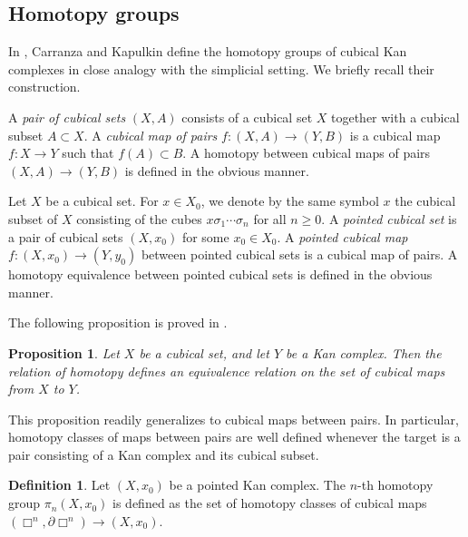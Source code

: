 \documentclass[oneside, 12pt]{amsart}
\numberwithin{equation}{section}
\theoremstyle{plain}
\newtheorem{proposition}[theorem]{Proposition}
\theoremstyle{definition}
\newtheorem{definition}[theorem]{Definition}
\theoremstyle{remark}
\begin{document}
	\subsection{Homotopy groups}
	
	In \cite{CK1}, Carranza and Kapulkin define the homotopy groups of cubical Kan complexes in close analogy with the simplicial setting. We briefly recall their construction.
	
	
	
	A \emph{pair of cubical sets} $(X,A)$ consists of a cubical set $X$ together with a cubical subset $A\subset X$. A \emph{cubical map of pairs} $f\colon(X,A)\to(Y,B)$ is a cubical map $f\colon X\to Y$ such that $f(A)\subset B$. A homotopy between cubical maps of pairs $(X,A)\to(Y,B)$ is defined in the obvious manner.
	
	
	
	Let $X$ be a cubical set. For $x\in X_0$, we denote by the same symbol $x$ the cubical subset of $X$ consisting of the cubes $x\sigma_1\cdots\sigma_n$ for all $n\ge 0$. A \emph{pointed cubical set} is a pair of cubical sets $(X,x_0)$ for some $x_0\in X_0$. A \emph{pointed cubical map} $f\colon(X,x_0)\to(Y,y_0)$ between pointed cubical sets is a cubical map of pairs. A homotopy equivalence between pointed cubical sets is defined in the obvious manner.%
	
	
	
	The following proposition is proved in \cite[Proposition 2.10]{CK1}.
	
	
	
	\begin{proposition}
		\label{homotopy equivalence relation}
		Let $X$ be a cubical set, and let $Y$ be a Kan complex. Then the relation of homotopy defines an equivalence relation on the set of cubical maps from $X$ to $Y$.
	\end{proposition}
	
	
	
	This proposition readily generalizes to cubical maps between pairs. In particular, homotopy classes of maps between pairs are well defined whenever the target is a pair consisting of a Kan complex and its cubical subset.
	
	
	
	\begin{definition}
		Let $(X,x_0)$ be a pointed Kan complex. The $n$-th homotopy group $\pi_n(X,x_0)$ is defined as the set of homotopy classes of cubical maps $(\Box^n,\partial\Box^n)\to(X,x_0)$.
	\end{definition}
	
\end{document}
